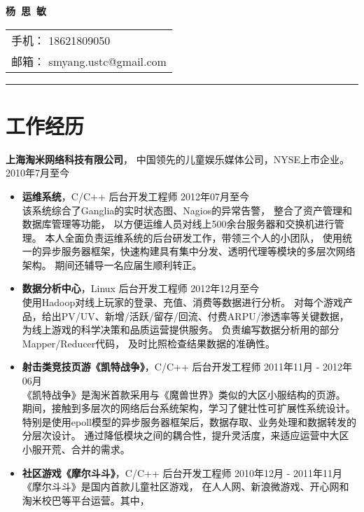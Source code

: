 \documentclass[margin]{res}
\newcommand{\taomee}{上海淘米网络科技有限公司}
\begin{document}
{\bfseries \huge 杨\ 思\ 敏}
\hfill
\begin{tabular}{l}
    手机： {18621809050}\\
    邮箱： {smyang.ustc@gmail.com}
\end{tabular}
\rule{\columnwidth}{1pt}


\section{\Large 工作经历}
{\bf \large \taomee}，
中国领先的儿童娱乐媒体公司，NYSE上市企业。
\hfill 2010年7月至今\\[1mm]
\begin{itemize}
    \item {\bf 运维系统}，C/C++ 后台开发工程师 
        \hfill 2012年07月至今\\[1mm]
        该系统综合了Ganglia的实时状态图、Nagios的异常告警，
        整合了资产管理和数据库管理等功能，
        以方便运维人员对线上500余台服务器和交换机进行管理。
        本人全面负责运维系统的后台研发工作，带领三个人的小团队，
        使用统一的异步服务器框架，快速构建具有集中分发、透明代理等模块的多层次网络架构。
        期间还辅导一名应届生顺利转正。
        \\
    \item {\bf 数据分析中心}，Linux 后台开发工程师
        \hfill 2012年12月至今\\[1mm]
        使用Hadoop对线上玩家的登录、充值、消费等数据进行分析。
        对每个游戏产品，给出PV/UV、新增/活跃/留存/回流、付费ARPU/渗透率等关键数据，
        为线上游戏的科学决策和品质运营提供服务。
        负责编写数据分析用的部分Mapper/Reducer代码，
        及时比照检查结果数据的准确性。
        \\
    \item {\bf 射击类竞技页游《凯特战争》}，C/C++ 后台开发工程师 
        \hfill 2011年11月 - 2012年06月\\[1mm]
        《凯特战争》是淘米首款采用与《魔兽世界》类似的大区小服结构的页游。
        期间，接触到多层次的网络后台系统架构，学习了健壮性可扩展性系统设计。
        特别是使用epoll模型的异步服务器框架后，数据存取、业务处理和数据转发的分层次设计。
        通过降低模块之间的耦合性，提升灵活度，来适应运营中大区小服开荒、合并的需求。
        \\
    \item {\bf 社区游戏《摩尔斗斗》}，C/C++ 后台开发工程师 
    \hfill 2010年12月 - 2011年11月\\[1mm]
        《摩尔斗斗》是国内首款儿童社区游戏，
        在人人网、新浪微游戏、开心网和淘米校巴等平台运营。其中，

\end{itemize}
\end{document}
